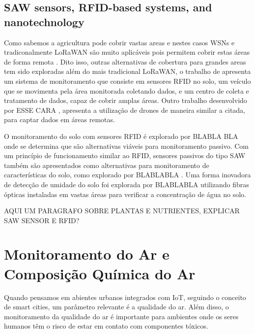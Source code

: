 \subsection{SAW sensors, RFID-based systems, and nanotechnology}
Como sabemos a agricultura pode cobrir vastas areas e nestes casos WSNs e tradiconalmente LoRaWAN são muito aplicáveis pois permitem cobrir estas áreas de forma remota \textcite{deng_2020_novel}. Dito isso, outras alternativas de cobertura para grandes areas tem sido exploradas além do mais tradicional LoRaWAN, o trabalho de \textcite{deng_2020_novel} apresenta um sistema de monitoramento que consiste em sensores RFID no solo, um veículo que se movimenta pela área monitorada coletando dados, e um centro de coleta e tratamento de dados, capaz de cobrir amplas áreas. Outro trabalho desenvolvido por ESSE CARA \textcite{akhileshnagpure_2022_water}, apresenta a utilização de drones de maneira similar a citada, para captar dados em áreas remotas.

O monitoramento do solo com sensores RFID é explorado por BLABLA BLA \textcite{akhileshnagpure_2022_water} onde se determina que são alternativas viáveis para monitoramento passivo. Com um princípio de funcionamento similar ao RFID, sensores passivos do tipo SAW também são apresentados como alternativas para monitoramento de características do solo, como explorado por BLABLABLA \textcite{akhileshnagpure_2022_water}. Uma forma inovadora de detecção de umidade do solo foi explorada por BLABLABLA \textcite{akhileshnagpure_2022_water} utilizando fibras ópticas instaladas em vastas áreas para verificar a concentração de água no solo.

AQUI UM PARAGRAFO SOBRE PLANTAS E NUTRIENTES, EXPLICAR SAW SENSOR E RFID?

\section{Monitoramento do Ar e Composição Química do Ar}
Quando pensamos em abientes urbanos integrados com IoT, seguindo o conceito de smart cities, um parâmetro relevante é a qualidade do ar. Além disso, o monitoramento da qualidade do ar é importante para ambientes onde os seres humanos têm o risco de estar em contato com componentes tóxicos.

